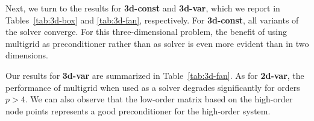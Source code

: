 \documentclass[smallcondensed,final]{svjour3}     %
\begin{document}

Next, we turn to the results for {\bf 3d-const} and {\bf 3d-var},
which we report in Tables~\ref{tab:3d-box} and \ref{tab:3d-fan},
respectively. For {\bf 3d-const}, all variants of the solver
converge. For this three-dimensional problem, the benefit of using
multigrid as preconditioner rather than as solver is even more evident
than in two dimensions.


Our results for {\bf 3d-var} are
summarized in Table~\ref{tab:3d-fan}. As for {\bf 2d-var}, the
performance of multigrid when used as a solver degrades significantly
for orders $p>4$. We can also observe that the low-order matrix based on
the high-order node points represents a good preconditioner for the
high-order system. 
\end{document}
